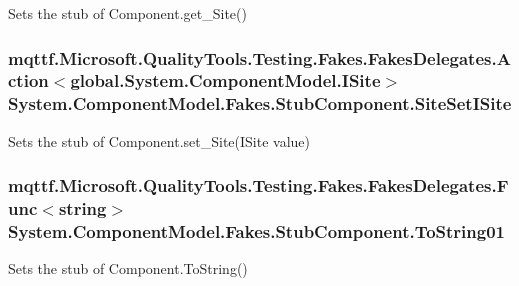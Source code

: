 Sets the stub of Component.\-get\-\_\-\-Site()

\hypertarget{class_system_1_1_component_model_1_1_fakes_1_1_stub_component_a44b3c3c8845afa24534786f25cfd45f6}{
\subsubsection[{Site\-Set\-I\-Site}]{\setlength{\rightskip}{0pt plus 5cm}mqttf.\-Microsoft.\-Quality\-Tools.\-Testing.\-Fakes.\-Fakes\-Delegates.\-Action$<$global.\-System.\-Component\-Model.\-I\-Site$>$ System.\-Component\-Model.\-Fakes.\-Stub\-Component.\-Site\-Set\-I\-Site}}\label{class_system_1_1_component_model_1_1_fakes_1_1_stub_component_a44b3c3c8845afa24534786f25cfd45f6}


Sets the stub of Component.\-set\-\_\-\-Site(\-I\-Site value)

\hypertarget{class_system_1_1_component_model_1_1_fakes_1_1_stub_component_a0e9a4fea77ef1be87e3bb068e46f6c45}{
\subsubsection[{To\-String01}]{\setlength{\rightskip}{0pt plus 5cm}mqttf.\-Microsoft.\-Quality\-Tools.\-Testing.\-Fakes.\-Fakes\-Delegates.\-Func$<$string$>$ System.\-Component\-Model.\-Fakes.\-Stub\-Component.\-To\-String01}}\label{class_system_1_1_component_model_1_1_fakes_1_1_stub_component_a0e9a4fea77ef1be87e3bb068e46f6c45}


Sets the stub of Component.\-To\-String()



